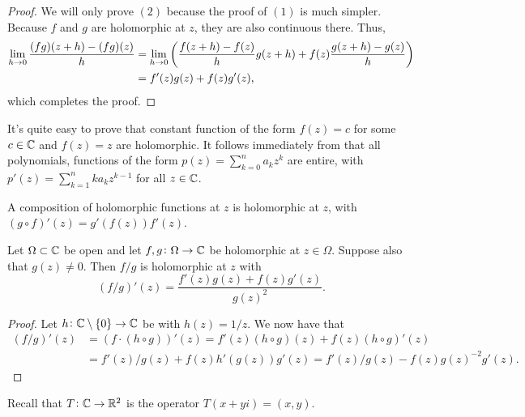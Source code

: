 \documentclass[11pt,a4paper]{article}
\begin{document}
\begin{proof}
  We will only prove $(2)$ because the proof of $(1)$ is much simpler.
  Because $f$ and $g$ are holomorphic at $z$, they are also continuous
  there. Thus,
  \begin{align*}
    \lim_{h \to 0} \frac{(f g)(z + h) - (f g)(z)}{h} &=
    \lim_{h \to 0} \del{\frac{f(z + h) - f(z)}{h} g(z + h) + 
  f(z) \frac{g(z + h) - g(z)}{h}} \\ &=
    f'(z)g(z) + f(z)g'(z),
  \end{align*}
  which completes the proof.
\end{proof}

\begin{corollary}
  It's quite easy to prove that constant function of the form $f(z) = c$
  for some $c \in \mathbb{C}$ and $f(z) = z$ are holomorphic.
  It follows immediately from  that all polynomials,
  functions of the form $p(z) = \sum_{k=0}^{n} a_k z^k$ are entire, with
  $p'(z) = \sum_{k=1}^{n} k a_k z^{k-1}$ for all $z \in \mathbb{C}$.
\end{corollary}

\begin{proposition}
  A composition of holomorphic functions at $z$ is holomorphic at $z$, with
  $(g \circ f)'(z) = g'(f(z)) f'(z)$.
\end{proposition}

\begin{corollary}
  Let $\Omega \subset \mathbb{C}$ be open and let $f,g \colon \Omega \to \mathbb{C}$ be
  holomorphic at $z \in \Omega$.
  Suppose also that $g(z) \neq 0$.
  Then $f/g$ is holomorphic at $z$ with
  \[
    (f/g)'(z) = \frac{f'(z)g(z) + f(z)g'(z)}{g(z)^2}.
  \]
\end{corollary}
\begin{proof}
  Let $h \colon \mathbb{C} \setminus \left\{0\right\} \to \mathbb{C}$ be with $h(z) = 1/z$.
  We now have that
  \begin{align*}
    (f/g)'(z) &=
    (f \cdot (h \circ g))'(z) =
    f'(z)(h \circ g)(z) + f(z)(h \circ g)'(z) \\ &=
    f'(z)/g(z) + f(z)h'(g(z))g'(z) =
    f'(z)/g(z) - f(z)g(z)^{-2}g'(z).
  \end{align*}
\end{proof}

\begin{remark}
Recall that $T \colon \mathbb{C} \to \mathbb{R}^2$ is the operator $T(x + y i) = (x,y)$.
\end{remark}
\end{document}
